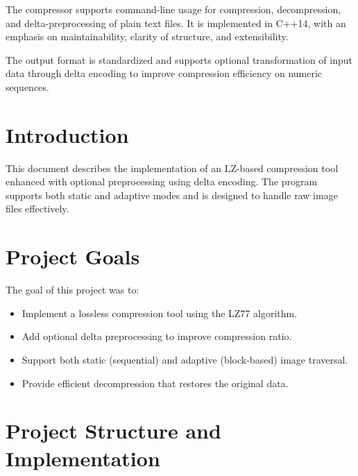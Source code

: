 \documentclass[a4paper,12pt]{article}
\begin{document}
    The compressor supports command-line usage for compression, decompression, and delta-preprocessing of plain text files. It is implemented in C++14, with an emphasis on maintainability, clarity of structure, and extensibility.

    The output format is standardized and supports optional transformation of input data through delta encoding to improve compression efficiency on numeric sequences.




    \section{Introduction}
    This document describes the implementation of an LZ-based compression tool enhanced with optional preprocessing using delta encoding. The program supports both static and adaptive modes and is designed to handle raw image files effectively.



    \section{Project Goals}
    The goal of this project was to:
    \begin{itemize}
        \item Implement a lossless compression tool using the LZ77 algorithm.
        \item Add optional delta preprocessing to improve compression ratio.
        \item Support both static (sequential) and adaptive (block-based) image traversal.
        \item Provide efficient decompression that restores the original data.
    \end{itemize}



    \section{Project Structure and Implementation}
\end{document}
